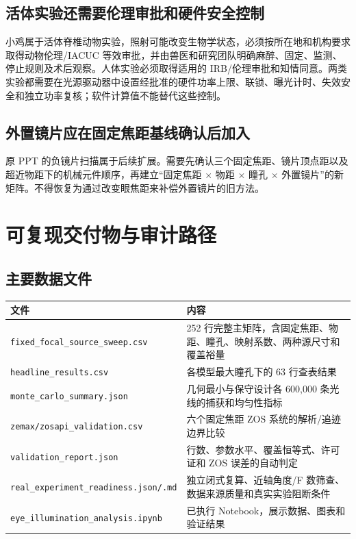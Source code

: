 \documentclass[UTF8,zihao=-4,openany,fontset=none]{ctexrep}
\newcommand{\sourcefile}[1]{\nolinkurl{#1}}
\begin{document}
\section{活体实验还需要伦理审批和硬件安全控制}
小鸡属于活体脊椎动物实验，照射可能改变生物学状态，必须按所在地和机构要求取得动物伦理/IACUC 等效审批，并由兽医和研究团队明确麻醉、固定、监测、停止规则及术后观察。人体实验必须取得适用的 IRB/伦理审批和知情同意。两类实验都需要在光源驱动器中设置经批准的硬件功率上限、联锁、曝光计时、失效安全和独立功率复核；软件计算值不能替代这些控制。

\section{外置镜片应在固定焦距基线确认后加入}
原 PPT 的负镜片扫描属于后续扩展。需要先确认三个固定焦距、镜片顶点距以及超近物距下的机械元件顺序，再建立“固定焦距 $\times$ 物距 $\times$ 瞳孔 $\times$ 外置镜片”的新矩阵。不得恢复为通过改变眼焦距来补偿外置镜片的旧方法。

\chapter{可复现交付物与审计路径}

\section{主要数据文件}
\begin{longtable}{p{5.6cm}p{9.2cm}}
\toprule
文件 & 内容\\
\midrule
\sourcefile{fixed\_focal\_source\_sweep.csv} & 252 行完整主矩阵，含固定焦距、物距、瞳孔、映射系数、两种源尺寸和覆盖裕量\\
\sourcefile{headline\_results.csv} & 各模型最大瞳孔下的 63 行查表结果\\
\sourcefile{monte\_carlo\_summary.json} & 几何最小与保守设计各 600,000 条光线的捕获和均匀性指标\\
\sourcefile{zemax/zosapi\_validation.csv} & 六个固定焦距 ZOS 系统的解析/追迹边界比较\\
\sourcefile{validation\_report.json} & 行数、参数水平、覆盖恒等式、许可证和 ZOS 误差的自动判定\\
\sourcefile{real\_experiment\_readiness.json/.md} & 独立闭式复算、近轴角度/F 数筛查、数据来源质量和真实实验阻断条件\\
\sourcefile{eye\_illumination\_analysis.ipynb} & 已执行 Notebook，展示数据、图表和验证结果\\
\bottomrule
\end{longtable}
\end{document}
